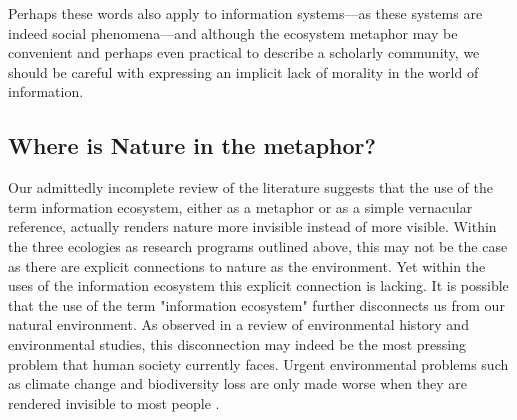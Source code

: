 Perhaps these words also apply to information systems—as these systems are indeed social phenomena—and although the ecosystem metaphor may be convenient and perhaps even practical to describe a scholarly community, we should be careful with expressing an implicit lack of morality in the world of information. 

\subsection{Where is Nature in the metaphor?}

Our admittedly incomplete review of the literature suggests that the use of the term information ecosystem, either as a metaphor or as a simple vernacular reference, actually renders nature more invisible instead of more visible. Within the three ecologies as research programs outlined above, this may not be the case as there are explicit connections to nature as the environment. Yet within the uses of the information ecosystem this explicit connection is lacking. It is possible that the use of the term "information ecosystem" further disconnects us from our natural environment. As observed in a review of environmental history and environmental studies, this disconnection may indeed be the most pressing problem that human society currently faces. Urgent environmental problems such as climate change and biodiversity loss are only made worse when they are rendered invisible to most people \citep{worthy_2013}.
